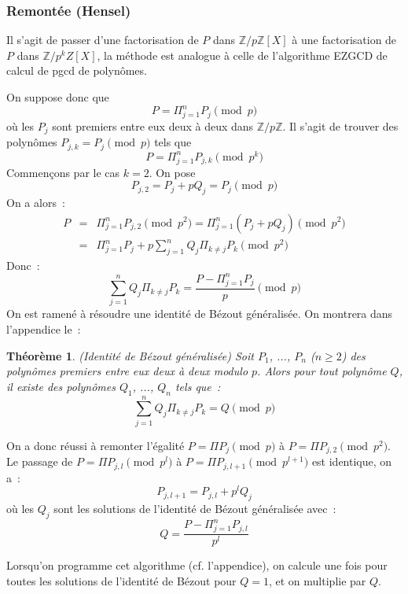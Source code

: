 \documentclass[a4paper,11pt]{article}
\newtheorem{thm}{Théorème}
\newcommand{\Z}{{\mathbb{Z}}}
\begin{document}
\subsubsection{Remontée (Hensel)} 
Il s'agit de passer d'une factorisation de $P$ dans $\Z/p\Z[X]$ à une
factorisation de $P$ dans $\Z/p^k Z[X]$, la méthode est analogue à celle
de l'algorithme EZGCD de calcul de pgcd de polynômes.

On suppose donc que
\[ P=\Pi_{j=1}^n P_j \pmod p \]
où les $P_j$ sont premiers entre eux deux à deux dans $\Z/p\Z$.
Il s'agit de trouver des polynômes $P_{j,k}=P_j \pmod p$ tels que
\[ P=\Pi_{j=1}^n P_{j,k} \pmod {p^k} \]
Commençons par le cas $k=2$. On pose
\[ P_{j,2}=P_j+pQ_j=P_j \pmod p \]
On a alors~:
\begin{eqnarray*}
 P&=&\Pi_{j=1}^n P_{j,2} \pmod {p^2} =\Pi_{j=1}^n (P_j+pQ_j) \pmod {p^2}\\
&=&\Pi_{j=1}^n P_j + p \sum_{j=1}^n Q_j \Pi_{k\neq j} P_k \pmod {p^2} 
\end{eqnarray*}
Donc~:
\[ \sum_{j=1}^n Q_j \Pi_{k\neq j} P_k= \frac{P-\Pi_{j=1}^n P_j}{p} \pmod p \]
On est ramené à résoudre une identité de Bézout généralisée.
On montrera dans l'appendice le~:
\begin{thm} (Identité de Bézout généralisée)
Soit $P_1$, ..., $P_n$ ($n\geq 2$) des polynômes premiers entre eux deux 
à deux modulo $p$. Alors pour tout polynôme $Q$, il existe des polynômes 
$Q_1$, ..., $Q_n$ tels que~:
\[ \sum_{j=1}^n Q_j \Pi_{k\neq j} P_k=Q \pmod p \]
\end{thm}


On a donc réussi à remonter l'égalité $P=\Pi P_j \pmod p$ à 
$P=\Pi P_{j,2} \pmod {p^2}$. Le passage de $P=\Pi P_{j,l} \pmod {p^l}$
à $P=\Pi P_{j,l+1} \pmod {p^{l+1}}$ est identique, on a~:
\[ P_{j,l+1}=P_{j,l}+p^{l}Q_j \]
où les $Q_j$ sont les solutions de l'identité de Bézout généralisée avec~:
\[ Q=\frac{P-\Pi_{j=1}^n P_{j,l}}{p^l}\]

Lorsqu'on programme cet algorithme (cf. l'appendice), 
on calcule une fois pour toutes les
solutions de l'identité de Bézout pour $Q=1$, et on multiplie par $Q$.
\end{document}
